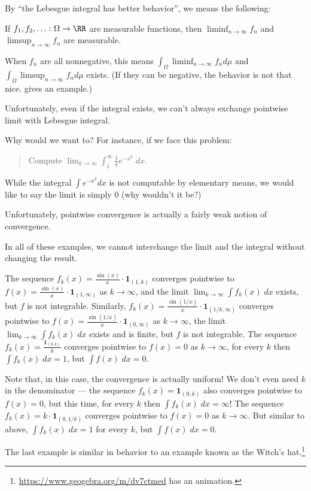 By ``the Lebesgue integral has better behavior'', we means the following:
\begin{proposition}
	If $f_1, f_2, \dots \colon \Omega \to \RR$ are measurable functions,
	then $\liminf_{n \to \infty} f_n$ and $\limsup_{n \to \infty} f_n$ are measurable.
\end{proposition}
When $f_n$ are all nonnegative, this means
$\int_\Omega \liminf_{n \to \infty} f_n d\mu$ and $\int_\Omega \limsup_{n \to \infty} f_n d\mu$ exists.
(If they can be negative, the behavior is not that nice.  gives an example.)

Unfortunately, even if the integral exists, we can't always exchange pointwise limit with Lebesgue
integral.

Why would we want to? For instance, if we face this problem:
\begin{quote}
	Compute $\lim_{k \to \infty} \int_1^\infty \frac{1}{k} e^{-x^2} \; dx$.
\end{quote}
While the integral $\int e^{-x^2} dx$ is not computable by elementary means,
we would like to say the limit is simply $0$ (why wouldn't it be?)

Unfortunately, pointwise convergence is actually a fairly weak notion of convergence.

\begin{example}
	\label{ex:failure_interchange_lim_int}
	In all of these examples, we cannot interchange the limit and the integral
	without changing the result.
	\begin{itemize}
		\ii The sequence $f_k(x) = \frac{\sin(x)}{x} \cdot \mathbf{1}_{(1, k)}$ converges pointwise to
		$f(x) = \frac{\sin(x)}{x} \cdot \mathbf{1}_{(1, \infty)}$ as $k \to \infty$,
		and the limit $\lim_{k \to \infty} \int f_k(x) \; dx$ exists, but $f$ is not integrable.
		\ii Similarly, $f_k(x) = \frac{\sin(1/x)}{x} \cdot \mathbf{1}_{(1/k, \infty)}$
		converges pointwise to $f(x) = \frac{\sin(1/x)}{x} \cdot \mathbf{1}_{(0, \infty)}$
		as $k \to \infty$,
		the limit $\lim_{k \to \infty} \int f_k(x) \; dx$ exists and is finite,
		but $f$ is not integrable.
		\ii The sequence $f_k(x) = \frac{\mathbf{1}_{(0, k)}}{k}$ converges pointwise to $f(x)=0$ as $k
		\to \infty$, for every $k$ then $\int f_k(x) \; dx=1$, but $\int f(x) \; dx=0$.

		Note that, in this case, the convergence is actually uniform!
		\ii We don't even need $k$ in the denominator --- the sequence $f_k(x) = \mathbf{1}_{(0, k)}$ also
		converges pointwise to $f(x)=0$, but this time, for every $k$ then $\int f_k(x) \; dx=\infty$!
		\ii The sequence $f_k(x) = k \cdot \mathbf{1}_{(0, 1/k)}$ converges pointwise to $f(x)=0$ as $k
		\to \infty$. But similar to above, $\int f_k(x) \; dx=1$ for every $k$, but
		$\int f(x) \; dx=0$.
	\end{itemize}
	The last example is similar in behavior to an example known as the Witch's hat.\footnote{%
	\url{https://www.geogebra.org/m/dv7ctmed} has an animation.}
\end{example}

